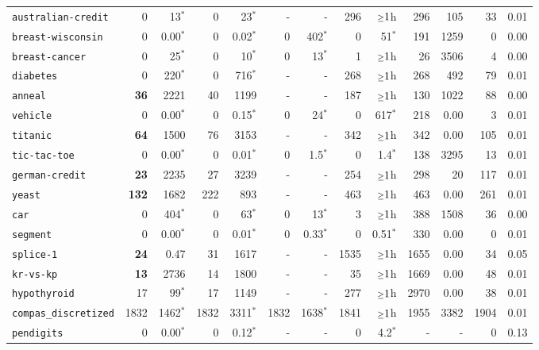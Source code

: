 \begin{tabular}{lrrrrrrrrrrrr}
\texttt{australian-credit} & 0 & 13$^*$ & 0 & 23$^*$ & - & - & 296 & $\mathsmaller{\geq}1$h & 296 & 105 & 33 & 0.01\\
\texttt{breast-wisconsin} & 0 & 0.00$^*$ & 0 & 0.02$^*$ & 0 & 402$^*$ & 0 & 51$^*$ & 191 & 1259 & 0 & 0.00\\
\texttt{breast-cancer} & 0 & 25$^*$ & 0 & 10$^*$ & 0 & 13$^*$ & 1 & $\mathsmaller{\geq}1$h & 26 & 3506 & 4 & 0.00\\
\texttt{diabetes} & 0 & 220$^*$ & 0 & 716$^*$ & - & - & 268 & $\mathsmaller{\geq}1$h & 268 & 492 & 79 & 0.01\\
\texttt{anneal} & \textbf{36} & 2221 & 40 & 1199 & - & - & 187 & $\mathsmaller{\geq}1$h & 130 & 1022 & 88 & 0.00\\
\texttt{vehicle} & 0 & 0.00$^*$ & 0 & 0.15$^*$ & 0 & 24$^*$ & 0 & 617$^*$ & 218 & 0.00 & 3 & 0.01\\
\texttt{titanic} & \textbf{64} & 1500 & 76 & 3153 & - & - & 342 & $\mathsmaller{\geq}1$h & 342 & 0.00 & 105 & 0.01\\
\texttt{tic-tac-toe} & 0 & 0.00$^*$ & 0 & 0.01$^*$ & 0 & 1.5$^*$ & 0 & 1.4$^*$ & 138 & 3295 & 13 & 0.01\\
\texttt{german-credit} & \textbf{23} & 2235 & 27 & 3239 & - & - & 254 & $\mathsmaller{\geq}1$h & 298 & 20 & 117 & 0.01\\
\texttt{yeast} & \textbf{132} & 1682 & 222 & 893 & - & - & 463 & $\mathsmaller{\geq}1$h & 463 & 0.00 & 261 & 0.01\\
\texttt{car} & 0 & 404$^*$ & 0 & 63$^*$ & 0 & 13$^*$ & 3 & $\mathsmaller{\geq}1$h & 388 & 1508 & 36 & 0.00\\
\texttt{segment} & 0 & 0.00$^*$ & 0 & 0.01$^*$ & 0 & 0.33$^*$ & 0 & 0.51$^*$ & 330 & 0.00 & 0 & 0.01\\
\texttt{splice-1} & \textbf{24} & 0.47 & 31 & 1617 & - & - & 1535 & $\mathsmaller{\geq}1$h & 1655 & 0.00 & 34 & 0.05\\
\texttt{kr-vs-kp} & \textbf{13} & 2736 & 14 & 1800 & - & - & 35 & $\mathsmaller{\geq}1$h & 1669 & 0.00 & 48 & 0.01\\
\texttt{hypothyroid} & 17 & 99$^*$ & 17 & 1149 & - & - & 277 & $\mathsmaller{\geq}1$h & 2970 & 0.00 & 38 & 0.01\\
\texttt{compas\_discretized} & 1832 & 1462$^*$ & 1832 & 3311$^*$ & 1832 & 1638$^*$ & 1841 & $\mathsmaller{\geq}1$h & 1955 & 3382 & 1904 & 0.01\\
\texttt{pendigits} & 0 & 0.00$^*$ & 0 & 0.12$^*$ & - & - & 0 & 4.2$^*$ & - & - & 0 & 0.13\\

\end{tabular}

